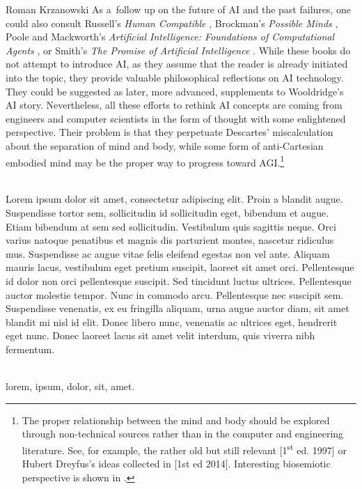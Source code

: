 \begin{newrevengenv}{Roman Krzanowski}
As a~follow up on the future of AI and the past failures, one could also consult Russell’s \textit{Human Compatible}
\parencite*{russell_human_2020},
Brockman’s \textit{Possible Minds}
\parencite*{brockman_possible_2019},
Poole and Mackworth’s \textit{Artificial Intelligence: Foundations of Computational Agents}
\parencite*{poole_artificial_2017},
or Smith’s \textit{The Promise of Artificial Intelligence}
\parencite*{smith_2019}.
While these books do not attempt to introduce AI, as they assume that the reader is already initiated into the topic, they provide valuable philosophical reflections on AI technology. They could be suggested as later, more advanced, supplements to Wooldridge’s AI story. Nevertheless, all these efforts to rethink AI concepts are coming from engineers and computer scientists in the form of thought with some enlightened perspective. Their problem is that they perpetuate Descartes’ miscalculation about the separation of mind and body, while some form of anti-Cartesian embodied mind may be the proper way to progress toward AGI.\footnote{The proper relationship between the mind and body should be explored through non-technical sources rather than in the computer and engineering literature. See, for example, the rather old but still relevant
\parencite[][pp.31–73]{abram_spell_2017} [1\textsuperscript{st} ed. 1997]
or Hubert Dreyfus’s ideas collected in
\parencite{dreyfus_skillful_2016} [1st ed 2014].
Interesting biosemiotic perspective is shown in
\parencite{sarosiek_role_2021}.
}



\vspace{15mm}%
{}\\{Lorem ipsum dolor sit amet, consectetur adipiscing elit. Proin a blandit augue. Suspendisse tortor sem, sollicitudin id sollicitudin eget, bibendum et augue. Etiam bibendum at sem sed sollicitudin. Vestibulum quis sagittis neque. Orci varius natoque penatibus et magnis dis parturient montes, nascetur ridiculus mus. Suspendisse ac augue vitae felis eleifend egestas non vel ante. Aliquam mauris lacus, vestibulum eget pretium suscipit, laoreet sit amet orci. Pellentesque id dolor non orci pellentesque suscipit. Sed tincidunt luctus ultrices. Pellentesque auctor molestie tempor. Nunc in commodo arcu. Pellentesque nec suscipit sem. Suspendisse venenatis, ex eu fringilla aliquam, urna augue auctor diam, sit amet blandit mi nisl id elit. Donec libero nunc, venenatis ac ultrices eget, hendrerit eget nunc. Donec laoreet lacus sit amet velit interdum, quis viverra nibh fermentum.}\par%
\vspace{2mm}%
{}\\{lorem, ipsum, dolor, sit, amet.}%



\end{newrevengenv}

